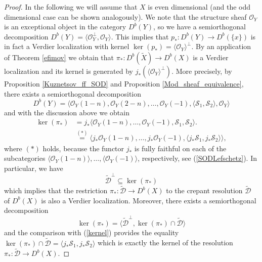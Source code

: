 \documentclass[a4paper, twoside, 11pt]{amsart}
\theoremstyle{definition}
\theoremstyle{remark}
\numberwithin{equation}{theorem}
\newcommand{\dbx}{D^b(X)}
\begin{document}
\begin{proof}
    In the following we will assume that $X$ is even dimensional (and the odd dimensional case can be shown analogously). We note that the structure sheaf $\mathcal{O}_Y$ is an exceptional object in the category $D^b(Y)$, so we have a semiorthogonal decomposition $D^b(Y) = \langle \mathcal{O}_Y^\perp, \mathcal{O}_Y \rangle$. This implies that $p_*\colon D^b(Y) \to D^b(\{x\})$ is in fact a Verdier localization with kernel $\ker(p_*) =\langle \mathcal{O}_Y\rangle^\perp$. By an application of Theorem \ref{efimov} we obtain that $\pi_*\colon D^b(\widetilde{X}) \to \dbx$ is a Verdier localization and its kernel is generated by $j_*( \langle \mathcal{O}_Y\rangle^\bot )$. More precisely, by Proposition \ref{Kuznetsov_ff_SOD} and Proposition \ref{Mod_sheaf_equivalence}, there exists a semiorthogonal decomposition 
    \begin{equation*}
		D^b(Y) = \langle \mathcal{O}_Y(1-n), \mathcal{O}_Y(2-n), \dots, \mathcal{O}_Y(-1),\langle \mathcal{S}_1,\mathcal{S}_2 \rangle, \mathcal{O}_Y \rangle
	\end{equation*}
   and with the discussion above we obtain 
    \begin{equation}\label{kernel}
    \begin{aligned}
        \ker(\pi_*) & = j_*\langle \mathcal{O}_Y(1-n), \dots, \mathcal{O}_Y(-1), \mathcal{S}_1, \mathcal{S}_2 \rangle. \\
         &\overset{(*)}{=}\langle j_*\mathcal{O}_Y(1-n),\dots, j_*\mathcal{O}_Y(-1), \langle j_*\mathcal{S}_1, j_*\mathcal{S}_2 \rangle \rangle, 
    \end{aligned}
    \end{equation}
    where $(*)$ holds, because the functor $j_*$ is fully faithful on each of the subcategories $\langle \mathcal{O}_Y(1-n)\rangle , \dots, \langle\mathcal{O}_Y(-1)\rangle$, respectively, see (\ref{SODLefschetz}). In particular, we have $$\widetilde{\mathcal{D}}^\bot \subseteq \ker(\pi_*)$$
    which implies that the restriction $\pi_*\colon\widetilde{\mathcal{D}} \to \dbx$ to the crepant resolution $\widetilde{\mathcal{D}}$ of $\dbx$ is also a Verdier localization. Moreover, there exists a semiorthogonal decomposition 
    \begin{equation*}
        \ker(\pi_*) = \langle \widetilde{\mathcal{D}}^\perp, \ker(\pi_*) \cap \widetilde{\mathcal{D}} \rangle 
    \end{equation*}
    and the comparison with (\ref{kernel}) provides the equality $\ker(\pi_*) \cap \widetilde{\mathcal{D}} = \langle j_*\mathcal{S}_1, j_*\mathcal{S}_2 \rangle$ which is exactly the kernel of the resolution $\pi_*\colon \widetilde{\mathcal{D}} \to \dbx$.
\end{proof}
\end{document}
